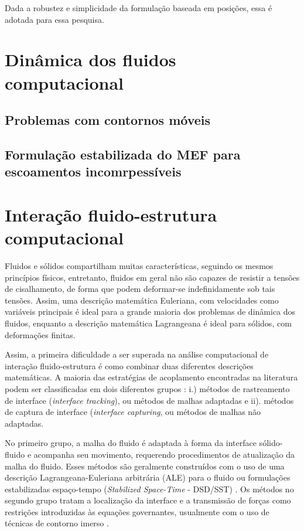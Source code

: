 \documentclass[_ArquivoPrincipal.tex]{subfiles}
\begin{document}
Dada a robustez e simplicidade da formulação baseada em posições, essa é adotada para essa pesquisa.


\section{Dinâmica dos fluidos computacional }

\subsection{Problemas com contornos móveis}

\subsection{Formulação estabilizada do MEF para escoamentos incomrpessíveis}

\section{Interação fluido-estrutura computacional}

Fluidos e sólidos compartilham muitas características, seguindo os mesmos princípios fí\-si\-cos, entretanto, fluidos em geral não são capazes de resistir a tensões de cisalhamento, de forma que podem deformar-se indefinidamente sob tais tensões. Assim, uma descrição matemática Euleriana, com velocidades como variáveis principais é ideal para a grande maioria dos problemas de dinâmica dos fluidos, enquanto a descrição matemática Lagrangeana é ideal para sólidos, com deformações finitas.

Assim, a primeira dificuldade a ser superada na análise computacional de interação fluido-estrutura é como combinar duas diferentes descrições matemáticas. A maioria das estratégias de acoplamento encontradas na literatura podem ser classificadas em dois diferentes grupos \cite{Tezduyar:1997,Tezduyar:1998,Houetal:2012,BazilevsTT:2013a}:
i.) métodos de rastreamento de interface (\textit{interface tracking}), ou métodos de malhas adaptadas e ii). métodos de captura de interface (\textit{interface capturing}, ou métodos de malhas não adaptadas.

No primeiro grupo, a malha do fluido é adaptada à forma da interface sólido-fluido e acompanha seu movimento, requerendo procedimentos de atualização da malha do fluido. Esses métodos são geralmente construídos com o uso de uma descrição Lagrangeana-Euleriana arbitrária (ALE) para o fluido \cite{HUGHES1981329,doneaALE,SanchesC:2014,KanchiM:2007,Rifai1999393} ou formulações estabilizadas espaço-tempo (\textit{Stabilized Space-Time} - DSD/SST) \cite{TezduyarBL:1992,TezduyarBML:1992, BazilevsTT:2013FSIBook}. Os métodos no segundo grupo tratam a localização da interface e a transmissão de forças como restrições introduzidas às equações governantes, usualmente com o uso de técnicas de contorno imerso \cite{Peskin:1977,Mittal2005239}.
\end{document}
